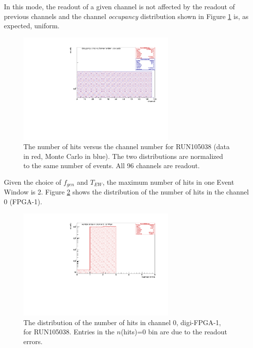 In this mode, the readout of a given channel is not affected 
by the readout of previous
channels and the channel \textit{occupancy} distribution shown 
in Figure \ref{fig:5} is, as expected, uniform.
\begin{figure}[!h]
\centering
\includegraphics[width =0.7\textwidth]{figures/pdf/figure_00002_nhitsvschannel_roc_simulation_2.pdf}
\caption[The occupancy histogram (RUN105038).]{The number of hits versus the channel number for RUN105038 
(data in red, Monte Carlo in blue). The two distributions 
are normalized to the same number of events. All 96 channels are readout.}
\label{fig:5}
\end{figure}

Given the choice of $f_{gen}$ and $T_{EW}$, 
the maximum number of hits in one Event Window is 2.
Figure \ref{fig:67} shows the distribution of the 
number of hits in the channel 0 (FPGA-1).
\begin{figure}[!h]
\centering
\includegraphics[width =0.7\textwidth]{figures/pdf/figure_00067_nhits_ch00_run105038.pdf}
\caption[The distribution of the number of hits in channel 0.]{
  The distribution of the number of hits in channel 0, digi-FPGA-1, for RUN105038.
  Entries in the $n$(hits)=0 bin are due to the readout errors.
}
\label{fig:67}
\end{figure}

